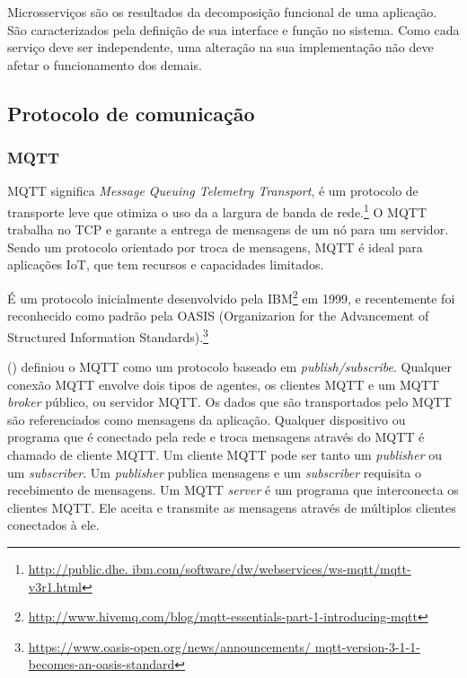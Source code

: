 Microsserviços são os resultados da decomposição funcional de uma aplicação. São caracterizados pela definição de sua interface e função no sistema. Como cada serviço deve ser independente, uma alteração na sua implementação não deve afetar o funcionamento dos demais. \cite{Pahl}

\subsection{Protocolo de comunicação}

\subsubsection{MQTT}

MQTT significa \textit{Message Queuing Telemetry Transport}, é um protocolo de transporte leve que otimiza o uso da a largura de banda de rede.\footnote{\url{http://public.dhe. ibm.com/software/dw/webservices/ws-mqtt/mqtt-v3r1.html}} O MQTT trabalha no TCP e garante a entrega de mensagens de um nó para um servidor. Sendo um protocolo orientado por troca de mensagens, MQTT é ideal para aplicações IoT, que tem recursos e capacidades limitados.

É um protocolo inicialmente desenvolvido pela IBM\footnote{\url{http://www.hivemq.com/blog/mqtt-essentials-part-1-introducing-mqtt}} em 1999, e recentemente foi reconhecido como padrão pela OASIS (Organizarion for the Advancement of Structured Information Standards).\footnote{\url{https://www.oasis-open.org/news/announcements/ mqtt-version-3-1-1-becomes-an-oasis-standard}}

\citeauthor{Kodali2017} (\citeyear{Kodali2017}) definiou o MQTT como um protocolo baseado em \textit {publish/subscribe}. Qualquer conexão MQTT envolve dois tipos de agentes, os clientes MQTT e um MQTT \textit {broker} público, ou servidor MQTT. Os dados que são transportados pelo MQTT são referenciados como mensagens da aplicação. Qualquer dispositivo ou programa que é conectado pela rede e troca mensagens através do MQTT é chamado de cliente MQTT. Um cliente MQTT pode ser tanto um \textit {publisher} ou um \textit {subscriber}. Um \textit {publisher} publica mensagens e um \textit {subscriber} requisita o recebimento de mensagens. Um MQTT \textit {server} é um programa que interconecta os clientes MQTT. Ele aceita e transmite as mensagens através de múltiplos clientes conectados à ele.

